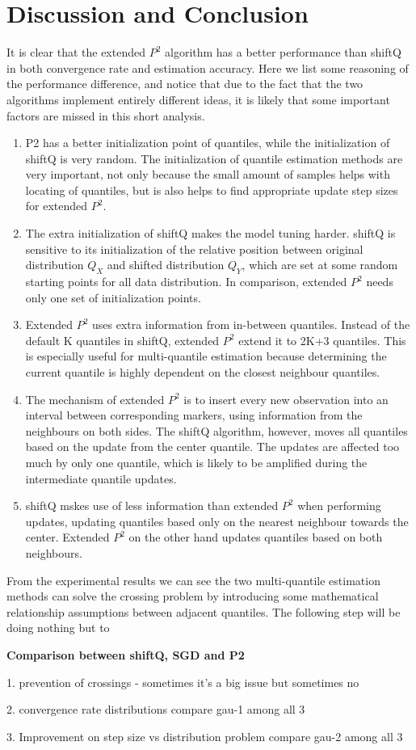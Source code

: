 \section{Discussion and Conclusion}
\label{sec: multi_discussion}
It is clear that the extended $P^2$ algorithm has a better performance than shiftQ in both convergence rate and estimation accuracy. Here we list some reasoning of the performance difference, and notice that due to the fact that the two algorithms implement entirely different ideas, it is likely that some important factors are missed in this short analysis.
\begin{enumerate}
    \item  P2 has a better initialization point of quantiles, while the initialization of shiftQ is very random. The initialization of quantile estimation methods are very important, not only because the small amount of samples helps with locating of quantiles, but is also helps to find appropriate update step sizes for extended $P^2$.
    \item The extra initialization of shiftQ makes the model tuning harder. shiftQ is sensitive to its initialization of the relative position between original distribution $Q_X$ and shifted distribution $Q_Y$, which are set at some random starting points for all data distribution. In comparison,  extended $P^2$ needs only one set of initialization points.
    \item Extended $P^2$ uses extra information from in-between quantiles. Instead of the default K quantiles in shiftQ, extended $P^2$ extend it to 2K+3 quantiles. This is especially useful for multi-quantile estimation because determining the current quantile is highly dependent on the closest neighbour quantiles.
    \item The mechanism of extended $P^2$ is to insert every new observation into an interval between corresponding markers, using information from the neighbours on both sides. The shiftQ algorithm, however, moves all quantiles based on the update from the center quantile. The updates are affected too much by only one quantile, which is likely to be amplified during the intermediate quantile updates.
    \item shiftQ mskes use of less information than extended $P^2$ when performing updates, updating quantiles based only on the nearest neighbour towards the center. Extended $P^2$ on the other hand updates quantiles based on both neighbours.
\end{enumerate}


From the experimental results we can see the two multi-quantile estimation methods can solve the crossing problem by introducing some mathematical relationship assumptions between adjacent quantiles. The following step will be doing nothing but to 

\textbf{Comparison between shiftQ, SGD and P2}

1. prevention of crossings - sometimes it's a big issue but sometimes no

2. convergence rate distributions
    compare gau-1 among all 3

3. Improvement on step size vs distribution problem
    compare gau-2 among all 3